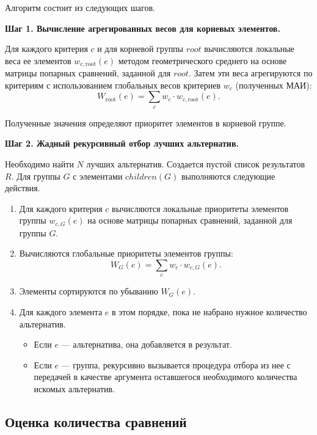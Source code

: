 Алгоритм состоит из следующих шагов.

\textbf{Шаг 1. Вычисление агрегированных весов для корневых элементов.}

Для каждого критерия \(c\) и для корневой группы \(root\) вычисляются локальные веса ее элементов \(w_{c,\text{root}}(e)\) методом геометрического среднего на основе матрицы попарных сравнений, заданной для \(root\). 
Затем эти веса агрегируются по критериям с использованием глобальных весов критериев \(w_c\) (полученных МАИ):
\begin{equation}
    \label{equation}
    W_{\text{root}}(e) = \sum_{c} w_c \cdot w_{c,\text{root}}(e).
\end{equation}

Полученные значения определяют приоритет элементов в корневой группе.

\textbf{Шаг 2. Жадный рекурсивный отбор лучших альтернатив.}

Необходимо найти $N$ лучших альтернатив. 
Создается пустой список результатов \(R\). 
Для группы \(G\) с элементами \(children(G)\) выполняются следующие действия.
\begin{enumerate}
    \item Для каждого критерия \(c\) вычисляются локальные приоритеты элементов группы \(w_{c,G}(e)\) на основе матрицы попарных сравнений, заданной для группы \(G\).
    \item Вычисляются глобальные приоритеты элементов группы: 
    \begin{equation}
        W_G(e) = \sum_{c} w_c \cdot w_{c,G}(e).
        \label{eq:globalprio}
    \end{equation}
    \item Элементы сортируются по убыванию \(W_G(e)\).
    \item Для каждого элемента \(e\) в этом порядке, пока не набрано нужное количество альтернатив.
        \begin{itemize}
            \item Если \(e\) --- альтернатива, она добавляется в результат.
            \item Если \(e\) --- группа, рекурсивно вызывается процедура отбора из нее с передачей в качестве аргумента оставшегося необходимого количества искомых альтернатив.
        \end{itemize}
\end{enumerate}

\subsection*{Оценка количества сравнений}

